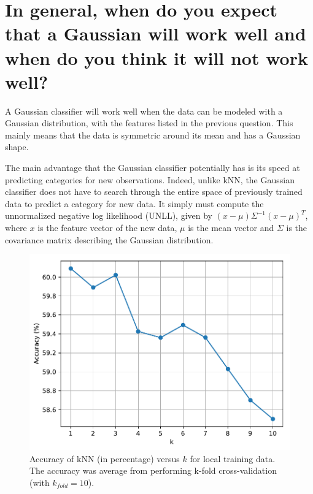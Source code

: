 \documentclass[a4paper,titlepage]{article}
\begin{document}
	\section{In general, when do you expect that a Gaussian will work well and when do you think it will not work well?}
	
	A Gaussian classifier will work well when the data can be modeled with a Gaussian distribution, with the features listed in the previous question. This mainly means that the data is symmetric around its mean and has a Gaussian shape.
	
	The main advantage that the Gaussian classifier potentially has is its speed at predicting categories for new observations. Indeed, unlike kNN, the Gaussian classifier does not have to search through the entire space of previously trained data to predict a category for new data. It simply must compute the unnormalized negative log likelihood (UNLL), given by $(x-\mu)\Sigma^{-1}(x-\mu)^T$, where $x$ is the feature vector of the new data, $\mu$ is the mean vector and $\Sigma$ is the covariance matrix describing the Gaussian distribution.
	
	\begin{figure}[!htb]
		\centering
		\includegraphics[width=\columnwidth]{plots/knn_accuracy_training.pdf}
		\caption
		{Accuracy of kNN (in percentage) versus $k$ for local training data. The accuracy was average from performing k-fold cross-validation (with $k_{fold} = 10$).}
		\label{fig:knn_accuracy_training}
	\end{figure}
	
\end{document}
